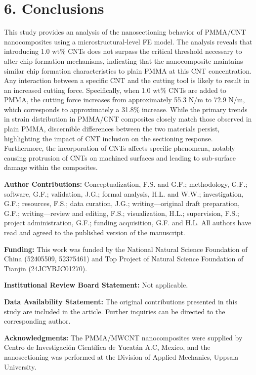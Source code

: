 \documentclass{article}
\begin{document}
\section*{6. Conclusions}

This study provides an analysis of the nanosectioning behavior of PMMA/CNT nanocomposites using a microstructural-level FE model. The analysis reveals that introducing 1.0 wt\% CNTs does not surpass the critical threshold necessary to alter chip formation mechanisms, indicating that the nanocomposite maintains similar chip formation characteristics to plain PMMA at this CNT concentration. Any interaction between a specific CNT and the cutting tool is likely to result in an increased cutting force. Specifically, when 1.0 wt\% CNTs are added to PMMA, the cutting force increases from approximately 55.3 N/m to 72.9 N/m, which corresponds to approximately a 31.8\% increase. While the primary trends in strain distribution in PMMA/CNT composites closely match those observed in plain PMMA, discernible differences between the two materials persist, highlighting the impact of CNT inclusion on the sectioning response. Furthermore, the incorporation of CNTs affects specific phenomena, notably causing protrusion of CNTs on machined surfaces and leading to sub-surface damage within the composites.

\noindent\textbf{Author Contributions:} Conceptualization, F.S. and G.F.; methodology, G.F.; software, G.F.; validation, J.G.; formal analysis, H.L. and W.W.; investigation, G.F.; resources, F.S.; data curation, J.G.; writing—original draft preparation, G.F.; writing—review and editing, F.S.; visualization, H.L.; supervision, F.S.; project administration, G.F.; funding acquisition, G.F. and H.L. All authors have read and agreed to the published version of the manuscript.

\noindent\textbf{Funding:} This work was funded by the National Natural Science Foundation of China (52405509, 52375461) and Top Project of Natural Science Foundation of Tianjin (24JCYBJC01270).

\noindent\textbf{Institutional Review Board Statement:} Not applicable.

\noindent\textbf{Data Availability Statement:} The original contributions presented in this study are included in the article. Further inquiries can be directed to the corresponding author.

\noindent\textbf{Acknowledgments:} The PMMA/MWCNT nanocomposites were supplied by Centro de Investigación Científica de Yucatán A.C, Mexico, and the nanosectioning was performed at the Division of Applied Mechanics, Uppsala University.
\end{document}
